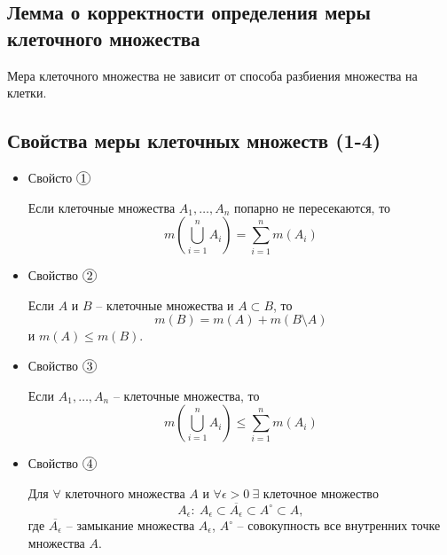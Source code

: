 \subsection{Лемма о корректности определения меры клеточного множества}

\begin{lemma}
    Мера клеточного множества не зависит от способа разбиения множества на клетки.
\end{lemma}

\subsection{Свойства меры клеточных множеств (1-4)}

\begin{itemize}
    \item Свойсто $ \circled{1} $
          \begin{statement}
              Если клеточные множества $ A_1,\ldots,A_n $ попарно не пересекаются, то
              \begin{equation}\label{eq:8.1.4}
                  m(\overset{n}{\underset{i=1}{\bigcup}}A_i) = \sum_{i=1}^{n}m(A_i)
              \end{equation}
          \end{statement}

    \item Свойство $ \circled{2} $
          \begin{statement}
              Если $ A $ и $ B $ -- клеточные множества и $ A \subset B $, то
              \begin{equation}\label{eq:8.1.5}
                  m(B) = m(A) + m(B \setminus A)
              \end{equation}
              и $ m(A) \leqslant m(B) $.
          \end{statement}

    \item Свойство $ \circled{3} $
          \begin{statement}
              Если $ A_1,\ldots,A_n $ -- клеточные множества, то
              \begin{equation}\label{eq:8.1.6}
                  m(\overset{n}{\underset{i=1}{\bigcup}}A_i) \leqslant \sum_{i=1}^{n}m(A_i)
              \end{equation}
          \end{statement}

    \newpage

    \item Свойство $ \circled{4} $
          \begin{statement}
              Для $ \forall $ клеточного множества $ A $ и $ \forall \epsilon > 0 \ \exists $ клеточное множество
              \[
                  A_\epsilon : \ A_\epsilon \subset \overline{A_\epsilon} \subset A^\circ \subset A,
              \]
              где $ \overline{A_\epsilon} $ -- замыкание множества $ A_\epsilon $, $ A^\circ $ -- совокупность все внутренних точке множества $ A $.
          \end{statement}
\end{itemize}

